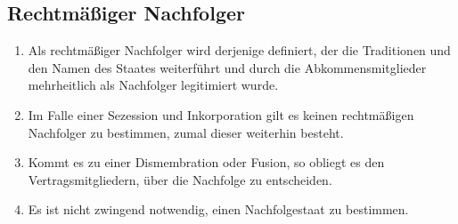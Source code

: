 \documentclass{article}
\begin{document}
\subsection{Rechtmäßiger Nachfolger}
\begin{enumerate}[(1)]
    \item Als rechtmäßiger Nachfolger wird derjenige definiert, der die Traditionen und den Namen des Staates weiterführt und durch die Abkommensmitglieder mehrheitlich als Nachfolger legitimiert wurde.
    \item Im Falle einer Sezession und Inkorporation gilt es keinen rechtmäßigen Nachfolger zu bestimmen, zumal dieser weiterhin besteht.
    \item Kommt es zu einer Dismembration oder Fusion, so obliegt es den Vertragsmitgliedern, über die Nachfolge zu entscheiden.
    \item Es ist nicht zwingend notwendig, einen Nachfolgestaat zu bestimmen.
\end{enumerate}
\end{document}
